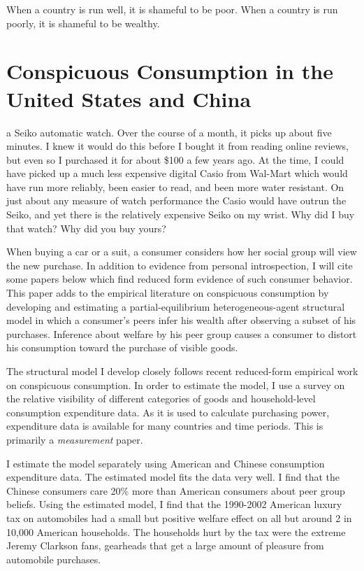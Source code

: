\begin{savequote}[75mm]
When a country is run well, it is shameful to be poor. When a country is run poorly, it is shameful to be wealthy.
\end{savequote}

\chapter{Conspicuous Consumption in the United States and China}

 a Seiko automatic watch.  Over the course of a month, it picks up about five minutes.  I knew it would do this before I bought it from reading online reviews, but even so I purchased it for about \$100 a few years ago.  At the time, I could have picked up a much less expensive digital Casio from Wal-Mart which would have run more reliably, been easier to read, and been more water resistant.  On just about any measure of watch performance the Casio would have outrun the Seiko, and yet there is the relatively expensive Seiko on my wrist.  Why did I buy that watch?  Why did you buy yours? 

When buying a car or a suit, a consumer considers how her social group will view the new purchase.  In addition to evidence from personal introspection, I will cite some papers below which find reduced form evidence of such consumer behavior. This paper adds to the empirical literature on conspicuous consumption by developing and estimating a partial-equilibrium heterogeneous-agent structural model in which a consumer's peers infer his wealth after observing a subset of his purchases.  Inference about welfare by his peer group causes a consumer to distort his consumption toward the purchase of visible goods.

The structural model I develop closely follows recent reduced-form empirical work on conspicuous consumption. \citep{Heffetz2011}  In order to estimate the model, I use a survey on the relative visibility of different categories of goods and household-level consumption expenditure data.  As it is used to calculate purchasing power, expenditure data is available for many countries and time periods.  This is primarily a \emph{measurement} paper.

I estimate the model separately using American and Chinese consumption expenditure data.  The estimated model fits the data very well.  I find that the Chinese consumers care 20\% more than American consumers about peer group beliefs.  Using the estimated model, I find that the 1990-2002 American luxury tax on automobiles had a small but positive welfare effect on all but around 2 in 10,000 American households.  The households hurt by the tax were the extreme Jeremy Clarkson fans, gearheads that get a large amount of pleasure from automobile purchases.

